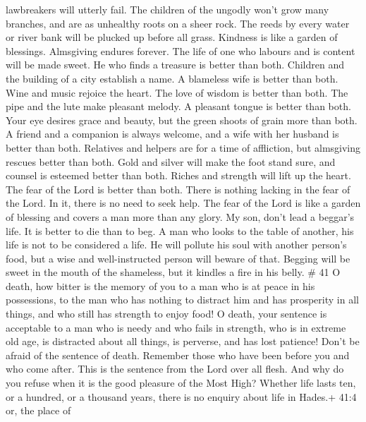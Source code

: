 lawbreakers will utterly fail.  The children of the ungodly
won't grow many branches, and are as unhealthy roots on a sheer rock.
 The reeds by every water or river bank will be plucked up
before all grass.  Kindness is like a garden of blessings.
Almsgiving endures forever.  The life of one who labours
and is content will be made sweet. He who finds a treasure is better
than both.  Children and the building of a city establish a
name. A blameless wife is better than both.  Wine and music
rejoice the heart. The love of wisdom is better than both. 
The pipe and the lute make pleasant melody. A pleasant tongue is better
than both.  Your eye desires grace and beauty, but the
green shoots of grain more than both.  A friend and a
companion is always welcome, and a wife with her husband is better than
both.  Relatives and helpers are for a time of affliction,
but almsgiving rescues better than both.  Gold and silver
will make the foot stand sure, and counsel is esteemed better than both.
 Riches and strength will lift up the heart. The fear of
the Lord is better than both. There is nothing lacking in the fear of
the Lord. In it, there is no need to seek help.  The fear
of the Lord is like a garden of blessing and covers a man more than any
glory.  My son, don't lead a beggar's life. It is better to
die than to beg.  A man who looks to the table of another,
his life is not to be considered a life. He will pollute his soul with
another person's food, but a wise and well-instructed person will beware
of that.  Begging will be sweet in the mouth of the
shameless, but it kindles a fire in his belly. \# 41  O
death, how bitter is the memory of you to a man who is at peace in his
possessions, to the man who has nothing to distract him and has
prosperity in all things, and who still has strength to enjoy food!
 O death, your sentence is acceptable to a man who is needy
and who fails in strength, who is in extreme old age, is distracted
about all things, is perverse, and has lost patience!  Don't
be afraid of the sentence of death. Remember those who have been before
you and who come after. This is the sentence from the Lord over all
flesh.  And why do you refuse when it is the good pleasure
of the Most High? Whether life lasts ten, or a hundred, or a thousand
years, there is no enquiry about life in Hades.+ 41:4 or, the place of
